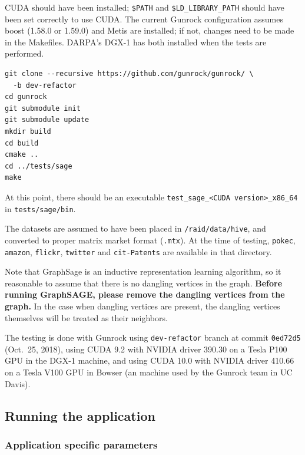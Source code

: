 \documentclass[10pt,oneside]{memoir}
\begin{document}
CUDA should have been installed; \texttt{\$PATH} and
\texttt{\$LD\_LIBRARY\_PATH} should have been set correctly to use CUDA.
The current Gunrock configuration assumes boost (1.58.0 or 1.59.0) and
Metis are installed; if not, changes need to be made in the Makefiles.
DARPA's DGX-1 has both installed when the tests are performed.

\begin{verbatim}
git clone --recursive https://github.com/gunrock/gunrock/ \
  -b dev-refactor
cd gunrock
git submodule init
git submodule update
mkdir build
cd build
cmake ..
cd ../tests/sage
make
\end{verbatim}

At this point, there should be an executable
\texttt{test\_sage\_\textless{}CUDA\ version\textgreater{}\_x86\_64} in
\texttt{tests/sage/bin}.

The datasets are assumed to have been placed in
\texttt{/raid/data/hive}, and converted to proper matrix market format
(\texttt{.mtx}). At the time of testing, \texttt{pokec},
\texttt{amazon}, \texttt{flickr}, \texttt{twitter} and
\texttt{cit-Patents} are available in that directory.

Note that GraphSage is an inductive representation learning algorithm,
so it reasonable to assume that there is no dangling vertices in the
graph. \textbf{Before running GraphSAGE, please remove the dangling
vertices from the graph.} In the case when dangling vertices are
present, the dangling vertices themselves will be treated as their
neighbors.

The testing is done with Gunrock using \texttt{dev-refactor} branch at
commit \texttt{0ed72d5} (Oct.~25, 2018), using CUDA 9.2 with NVIDIA
driver 390.30 on a Tesla P100 GPU in the DGX-1 machine, and using CUDA
10.0 with NVIDIA driver 410.66 on a Tesla V100 GPU in Bowser (an machine
used by the Gunrock team in UC Davis).

\hypertarget{running-the-application-2}{%
\subsection{Running the application}\label{running-the-application-2}}

\hypertarget{application-specific-parameters}{%
\subsubsection{Application specific
parameters}\label{application-specific-parameters}}
\end{document}
